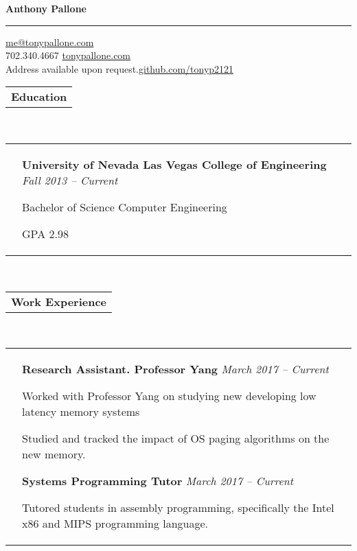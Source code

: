 \documentclass[12pt]{article}
\begin{document}
\begin{center}
\Huge {\bf Anthony Pallone}
\smallskip
\hrule
\smallskip
\normalsize{\href{mailto:me@tonypallone.com}{me@tonypallone.com}} \\
\smallskip
\normalsize{702.340.4667 \hfill
\href{http://tonypallone.com/}{tonypallone.com}}
\\
\small Address available upon request.\hfill \normalsize \href{http://github.com/tonyp2121}{github.com/tonyp2121}
\end{center}
\raggedright{\begin{tabular}[b]{p{4.9cm}}
	\bf{\large{Education}} \\
    \cline{1-1}
\end{tabular}} \\
\smallskip \smallskip
\begin{tabular}[b]{p{1.3cm} p{14.4cm} }
	& \small{\bf{University of Nevada Las Vegas College of Engineering}} \hfill \emph{\footnotesize{Fall 2013 -- Current}}
    \begin{compactitem}
    	\item Bachelor of Science Computer Engineering
    	\item GPA 2.98
	\end{compactitem}
\end{tabular}\\
\raggedright{\begin{tabular}[b]{p{4.9cm}}
	\bf{\large{Work Experience}} \\
    \cline{1-1}
\end{tabular}} \\
\smallskip \smallskip
\begin{tabular}[b]{p{1.3cm} p{14.4cm}}
	& \small{\bf{Research Assistant. Professor Yang}} \hfill \emph{\footnotesize{March 2017 -- Current}}
    \begin{compactitem}
    	\item Worked with Professor Yang on studying new developing low latency memory systems
    	\item Studied and tracked the impact of OS paging algorithms on the new memory.
	\end{compactitem} \medskip
    \small{\bf{Systems Programming Tutor}} \hfill \emph{\footnotesize{March 2017 -- Current}}
    \begin{compactitem}
    	\item Tutored students in assembly programming, specifically the Intel x86 and MIPS programming language.
	\end{compactitem} \medskip
\end{tabular}
\end{document}
